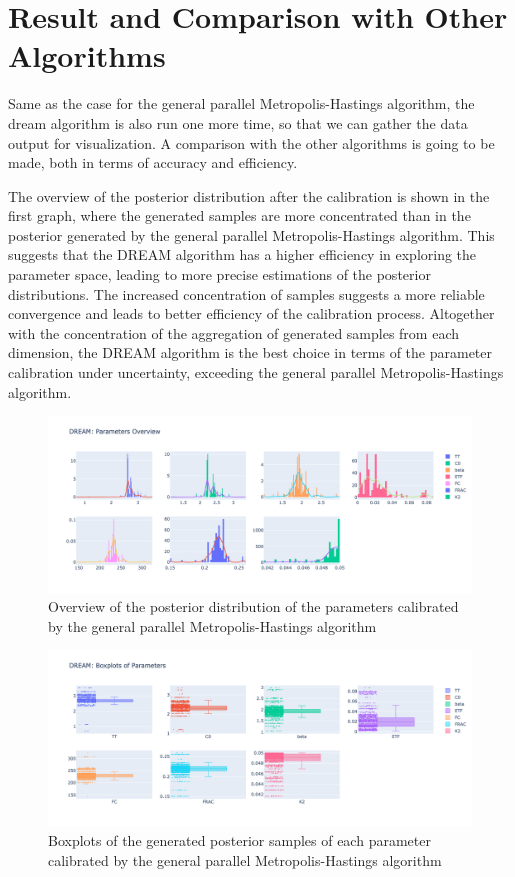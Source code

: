 \section{Result and Comparison with Other Algorithms}
Same as the case for the general parallel Metropolis-Hastings algorithm, the dream algorithm is also run one more time, so that we can gather the data output for visualization. A comparison with the other algorithms is going to be made, both in terms of accuracy and efficiency.

The overview of the posterior distribution after the calibration is shown in the first graph, where the generated samples are more concentrated than in the posterior generated by the general parallel Metropolis-Hastings algorithm. This suggests that the DREAM algorithm has a higher efficiency in exploring the parameter space, leading to more precise estimations of the posterior distributions. The increased concentration of samples suggests a more reliable convergence and leads to better efficiency of the calibration process. Altogether with the concentration of the aggregation of generated samples from each dimension, the DREAM algorithm is the best choice in terms of the parameter calibration under uncertainty, exceeding the general parallel Metropolis-Hastings algorithm.

\begin{figure}[H]
    \centering
    \includegraphics[width=1\textwidth]{figures/dream/paramter_overview.png}
    \captionsetup{width=.8\textwidth}
    \caption{Overview of the posterior distribution of the parameters calibrated by the general parallel Metropolis-Hastings algorithm}
    \label{fig:enter-label}
\end{figure}

\begin{figure}[H]
    \centering
    \includegraphics[width=1\textwidth]{figures/dream/boxplot.png}
    \captionsetup{width=.8\textwidth}
    \caption{Boxplots of the generated posterior samples of each parameter calibrated by the general parallel Metropolis-Hastings algorithm}
    \label{fig:enter-label}
\end{figure}

